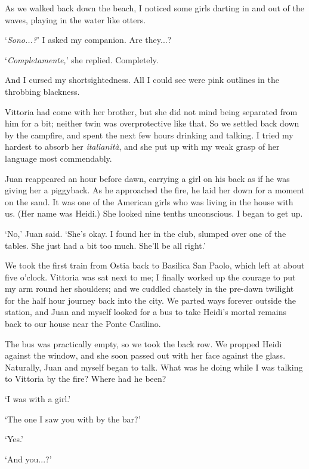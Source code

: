 \documentclass{amsbook}
\begin{document}
As we walked back down the beach, I noticed some girls darting in and out of the waves, playing in the water like otters.

`\textit{Sono...?}' I asked my companion. \hspace{0.5in} {\footnotesize Are they...?}

`\textit{Completamente,}' she replied. \hspace{0.5in} {\footnotesize Completely.}

And I cursed my shortsightedness. All I could see were pink outlines in the throbbing blackness.

Vittoria had come with her brother, but she did not mind being separated from him for a bit; neither twin was overprotective like that. So we settled back down by the campfire, and spent the next few hours drinking and talking. I tried my hardest to absorb her \textit{italianit\`a}, and she put up with my weak grasp of her language most commendably.

Juan reappeared an hour before dawn, carrying a girl on his back as if he was giving her a piggyback. As he approached the fire, he laid her down for a moment on the sand. It was one of the American girls who was living in the house with us. (Her name was Heidi.) She looked nine tenths unconscious. I began to get up.

`No,' Juan said. `She's okay. I found her in the club, slumped over one of the tables. She just had a bit too much. She'll be all right.'

We took the first train from Ostia back to Basilica San Paolo, which left at about five o'clock. Vittoria was sat next to me; I finally worked up the courage to put my arm round her shoulders; and we cuddled chastely in the pre-dawn twilight for the half hour journey back into the city. We parted ways forever outside the station, and Juan and myself looked for a bus to take Heidi's mortal remains back to our house near the Ponte Casilino.

The bus was practically empty, so we took the back row. We propped Heidi against the window, and she soon passed out with her face against the glass. Naturally, Juan and myself began to talk. What was he doing while I was talking to Vittoria by the fire? Where had he been?

`I was with a girl.'

`The one I saw you with by the bar?'

`Yes.'

`And you...?'
\end{document}
